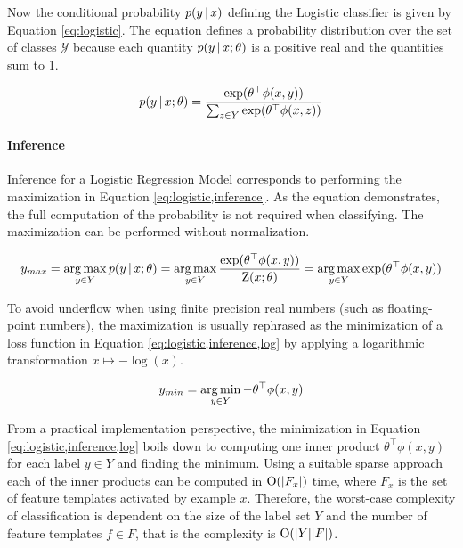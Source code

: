 Now the conditional probability $p(y\mbox{$ \, | \, $} x)$ defining the Logistic
classifier is given by Equation \eqref{eq:logistic}. The equation
defines a probability distribution over the set of classes
$\mathcal{Y}$ because each quantity $p(y\mbox{$ \, | \, $} x\mbox{$ ; \, $}\theta)$ is a
positive real and the quantities sum to 1.

\begin{equation}
p(y\mbox{$ \, | \, $} x\mbox{$ ; \, $} \theta) = \frac{\exp(\theta^\top \phi(x,y))}{\sum_{z \in Y}\exp(\theta^\top \phi(x,z))}\label{eq:logistic}
\end{equation}

\paragraph{Inference} Inference for a Logistic Regression Model
corresponds to performing the maximization in Equation \ref{eq:logistic,inference}. As the equation demonstrates, the full computation of the probability is not required when classifying. The maximization can be performed without normalization.

\begin{equation}y_{max} = \operatorname*{arg\,max}_{y \in Y} p(y\mbox{$ \, | \, $} x\mbox{$ ; \, $} \theta) = \operatorname*{arg\,max}_{y\in Y} \frac{\exp(\theta^\top \phi(x,y))}{\mbox{${\rm Z}$}(x;\theta)} = \operatorname*{arg\,max}_{y \in Y} \exp(\theta^\top \phi(x,y))\label{eq:logistic,inference}\end{equation}

To avoid underflow when using finite precision real numbers (such as
floating-point numbers), the maximization is usually rephrased as the
minimization of a loss function in Equation
\ref{eq:logistic,inference,log} by applying a logarithmic
transformation $x \mapsto -\log(x)$.

\begin{equation}y_{min} = \operatorname*{arg\,min}_{y\in Y} -\theta^\top \phi(x,y)\label{eq:logistic,inference,log}\end{equation}

From a practical implementation perspective, the minimization in
Equation \ref{eq:logistic,inference,log} boils down to computing one
inner product $\theta^\top \phi(x,y)$ for each label $y \in Y$ and
finding the minimum. Using a suitable sparse approach each of the
inner products can be computed in $\mbox{${\rm O}$}(|F_x|)$ time, where $F_x$ is the
set of feature templates activated by example $x$. Therefore, the
worst-case complexity of classification is dependent on the size of
the label set $Y$ and the number of feature templates $f \in F$, that
is the complexity is $\mbox{${\rm O}$}(|Y||F|)$.

